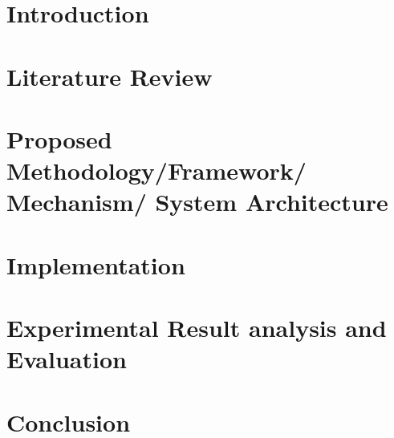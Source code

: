 \documentclass[12pt, a4paper]{report}
\begin{document}
\chapter{Introduction}\label{chapter:chapter1}
\onehalfspacing
\setcounter{page}{0}


\chapter{Literature Review}\label{chapter:chapter2}


\chapter{Proposed Methodology/Framework/ Mechanism/ System Architecture}\label{chapter:chapter3}


\chapter{Implementation }\label{chapter:chapter4}


\chapter{Experimental Result analysis and Evaluation}\label{chapter:chapter5r}


\chapter{Conclusion}\label{chapter:chapter6} 


\pagebreak
{}
{}
\nocite{*}
\printbibliography
\pagebreak
{}
\end{document}
